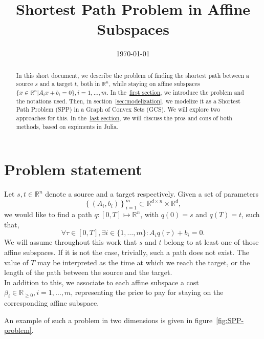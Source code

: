 \documentclass[a4paper, 12pt]{article}
\title{Shortest Path Problem in Affine Subspaces}
\author{}
\date{\vspace{-1cm}\today}
\begin{document}
\maketitle

\begin{abstract}
    In this short document, we describe the problem of finding the shortest path between a source $s$ and a target $t$, both in $\mathbb{R}^n$, while staying on affine subspaces $\{x \in \mathbb{R}^n \vert A_i x + b_i = 0\}, i = 1, \dots, m$. In the~\hyperref[sec:statement]{first section}, we introduce the problem and the notations used. Then, in section~\ref{sec:modelization}, we modelize it as a Shortest Path Problem (SPP) in a Graph of Convex Sets (GCS). We will explore two approaches for this. In the~\hyperref[sec:experiments]{last section}, we will discuss the pros and cons of both methods, based on expiments in Julia.
\end{abstract}

\section{Problem statement}\label{sec:statement}
Let $s, t \in \mathbb{R}^n$ denote a source and a target respectively. Given a set of parameters \[{\left\{(A_i, b_i)\right\}}_{i=1}^{m} \subset \mathbb{R}^{d \times n} \times \mathbb{R}^d,\] we would like to find a path $q : [0,T] \mapsto \mathbb{R}^n$, with $q(0) = s$ and $q(T) = t$, such that, \[\forall \tau \in [0,T], \exists i \in \{1, \dots, m\} : A_i q(\tau) + b_i = 0.\] We will assume throughout this work that $s$ and $t$ belong to at least one of those affine subspaces. If it is not the case, trivially, such a path does not exist. The value of $T$ may be interpreted as the time at which we reach the target, or the length of the path between the source and the target.\\
In addition to this, we associate to each affine subspace a cost $\beta_i \in \mathbb{R}_{\geq 0}, i = 1, \dots, m$, representing the price to pay for staying on the corresponding affine subspace.

An example of such a problem in two dimensions is given in figure~\ref{fig:SPP-problem}.
\end{document}
